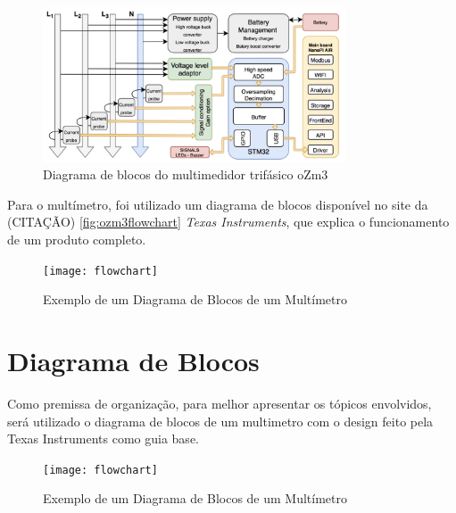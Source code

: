 \begin{figure}[h]
    \caption{Diagrama de blocos do multimedidor trifásico oZm3}
    \label{fig:ozm3flowchart}
    \includegraphics[width=0.8\textwidth]{figuras/openzmeter-diagrama.png}
\end{figure}

Para o multímetro, foi utilizado um diagrama de blocos disponível no site da (CITAÇÃO) \autoref{fig:ozm3flowchart} \textit{Texas Instruments}, que explica o funcionamento de um produto completo.

\begin{figure}[h]%
    \caption{Exemplo de um Diagrama de Blocos de um Multímetro}%
    \label{fig:multimeterflowchart}%
    \texttt{[image: flowchart]}%
\end{figure}


\section{Diagrama de Blocos}\label{sec:fchart}

Como premissa de organização, para melhor apresentar os tópicos envolvidos, será utilizado o diagrama de blocos de um multimetro com o design feito pela Texas Instruments como guia base.

\begin{figure}[htb]%
    \caption{Exemplo de um Diagrama de Blocos de um Multímetro}%
    \label{fig:flowChart2}%
    \texttt{[image: flowchart]}%
\end{figure}

